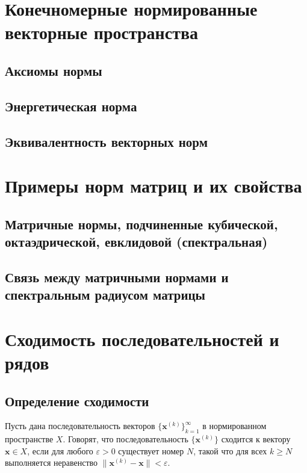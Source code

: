 \documentclass{article}
\begin{document}
\tableofcontents

\section{Конечномерные нормированные векторные пространства}

\subsection{Аксиомы нормы}
\subsection{Энергетическая норма}
\subsection{Эквивалентность векторных норм}

\section{Примеры норм матриц и их свойства}

\subsection{Матричные нормы, подчиненные кубической, октаэдрической, евклидовой (спектральная)}
\subsection{Связь между матричными нормами и спектральным радиусом матрицы}

\section{Сходимость последовательностей и рядов}

\subsection{Определение сходимости}

Пусть дана последовательность векторов \( \{\mathbf{x}^{(k)}\}_{k=1}^{\infty} \) в нормированном пространстве \( X \). Говорят, что последовательность \( \{\mathbf{x}^{(k)}\} \) сходится к вектору \( \mathbf{x} \in X \), если для любого \( \varepsilon > 0 \) существует номер \( N \), такой что для всех \( k \geq N \) выполняется неравенство \( \|\mathbf{x}^{(k)} - \mathbf{x}\| < \varepsilon \).
\end{document}
